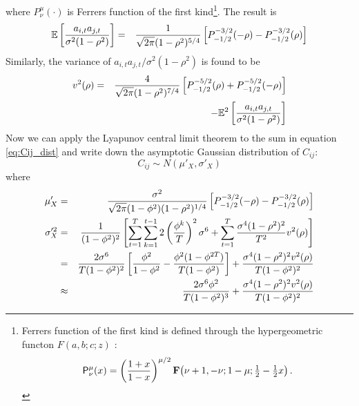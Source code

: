 where $P^\mu_\nu(\cdot)$ is Ferrers function of the first
kind\footnote{ Ferrers function of the first kind is defined through
  the hypergeometric functon $F(a, b; c; z)$ \cite{NIST:DLMF}:
  \begin{equation}
    \label{eq:Ferrers_1st}
    \mathop{\mathsf{P}^{\mu}_{\nu}\/}\nolimits\!\left(x\right)=\left(\frac{1+x}{1-
        x}\right)^{\mu/2}\mathop{\mathbf{F}\/}\nolimits\!\left(\nu+1,-\nu;1-\mu;\tfrac
      {1}{2}-\tfrac{1}{2}x\right).
  \end{equation}
}. The result is
\begin{eqnarray*}
  \mathbb{E}\left[{a_{i,t}a_{j,t} \over \sigma^2 (1 - \rho^2)}\right]
  &=&
  {1 \over \sqrt{2\pi} (1 - \rho^2)^{5/4}} \left[
    P^{-3/2}_{-1/2}(-\rho) - P^{-3/2}_{-1/2}(\rho)
  \right]
\end{eqnarray*}
Similarly, the variance of $a_{i,t}a_{j,t}/\sigma^2 (1 - \rho^2)$ is
found to be
\begin{eqnarray*}
  v^2(\rho) &=&
  {4 \over \sqrt{2\pi} (1 - \rho^2)^{7/4}} \left[
    P^{-5/2}_{-1/2}(\rho) + P^{-5/2}_{-1/2}(-\rho)
  \right] \\
  && - \mathbb{E}^2\left[{a_{i,t}a_{j,t} \over
      \sigma^2 (1 - \rho^2)}\right]
\end{eqnarray*}
Now we can apply the Lyapunov central limit theorem
\cite{Billingsley1995} to the sum in equation \ref{eq:Cij_dist}
and write down the asymptotic Gaussian distribution of $C_{ij}$:
\begin{equation*}
C_{ij} \sim N(\mu'_X, \sigma'_X)
\end{equation*}
where
\begin{eqnarray}
  \mu'_X &=& {\sigma^2 \over \sqrt{2\pi} (1 - \phi^2)(1 -
    \rho^2)^{1/4}} \left[ P^{-3/2}_{-1/2}(-\rho) -
    P^{-3/2}_{-1/2}(\rho)
  \right] \label{eq:gaussian_mean}\\
  \sigma'^2_X &=& {1 \over (1 - \phi^2)^2}\left[
    \sum_{t=1}^T \sum_{k=1}^{t-1} 2\left(
      \phi^k \over T
    \right)^2 \sigma^6 + \sum_{t=1}^T
    {\sigma^4 (1 - \rho^2)^2 \over T^2} v^2(\rho)
  \right] \nonumber \\
  &=& {2 \sigma^6 \over T (1 - \phi^2)^2} \left[
    {\phi^2 \over 1 - \phi^2} -
    {\phi^2 (1 - \phi^{2T}) \over
      T(1 - \phi^2)}
  \right] + {\sigma^4 (1 - \rho^2)^2 v^2(\rho) \over
    T (1 - \phi^2)^2} \nonumber \\
  &\approx& {2 \sigma^6 \phi^2 \over T (1 - \phi^2)^3}
  + {\sigma^4 (1 - \rho^2)^2 v^2(\rho) \over
    T (1 - \phi^2)^2} \label{eq:gaussian_variance}
\end{eqnarray}

